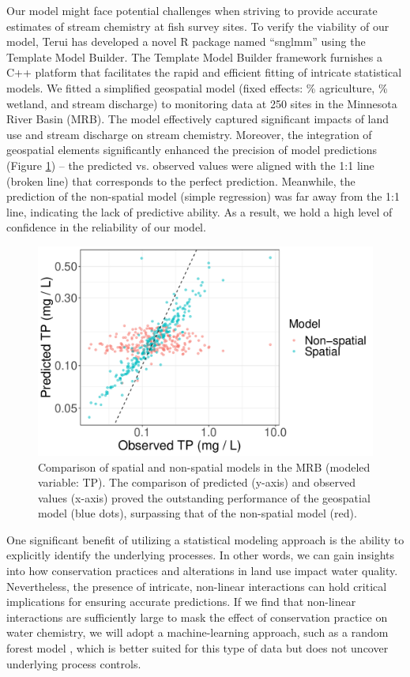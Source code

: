 \documentclass[12pt, class=article, crop=false]{standalone}
\begin{document}
Our model might face potential challenges when striving to provide accurate estimates of stream chemistry at fish survey sites. To verify the viability of our model, Terui has developed a novel R package named ``snglmm'' using the Template Model Builder.
The Template Model Builder framework furnishes a C++ platform that facilitates the rapid and efficient fitting of intricate statistical models.
We fitted a simplified geospatial model (fixed effects: \% agriculture, \% wetland, and stream discharge) to monitoring data at 250 sites in the Minnesota River Basin (MRB). The model effectively captured significant impacts of land use and stream discharge on stream chemistry. Moreover, the integration of geospatial elements significantly enhanced the precision of model predictions (Figure \ref{fig:tpfit}) -- the predicted vs. observed values were aligned with the 1:1 line (broken line) that corresponds to the perfect prediction. Meanwhile, the prediction of the non-spatial model (simple regression) was far away from the 1:1 line, indicating the lack of predictive ability. As a result, we hold a high level of confidence in the reliability of our model.

\begin{figure}
    \includegraphics[scale=0.35]{output/fig_tpfit.pdf}
    \caption{Comparison of spatial and non-spatial models in the MRB (modeled variable: TP). The comparison of predicted (y-axis) and observed values (x-axis) proved the outstanding performance of the geospatial model (blue dots), surpassing that of the non-spatial model (red).}
    \label{fig:tpfit}
\end{figure}

One significant benefit of utilizing a statistical modeling approach is the ability to explicitly identify the underlying processes. In other words, we can gain insights into how conservation practices and alterations in land use impact water quality. Nevertheless, the presence of intricate, non-linear interactions can hold critical implications for ensuring accurate predictions. If we find that non-linear interactions are sufficiently large to mask the effect of conservation practice on water chemistry, we will adopt a machine-learning approach, such as a random forest model \citep{ryo_statistically_2017}, which is better suited for this type of data but does not uncover underlying process controls. 
\end{document}
